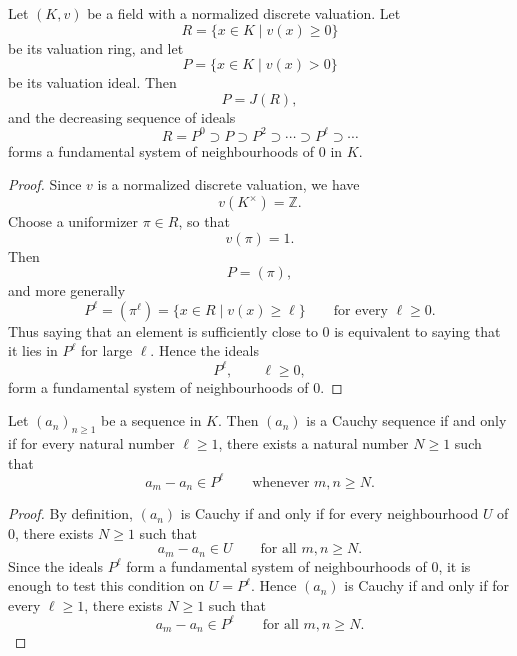 \begin{proposition}
    Let \((K,v)\) be a field with a normalized discrete valuation. Let
    \[
        R=\{x\in K\mid v(x)\geq 0\}
    \]
    be its valuation ring, and let
    \[
        P=\{x\in K\mid v(x)>0\}
    \]
    be its valuation ideal. Then
    \[
        P=J(R),
    \]
    and the decreasing sequence of ideals
    \[
        R=P^0\supset P\supset P^2\supset \cdots \supset P^\ell\supset \cdots
    \]
    forms a fundamental system of neighbourhoods of \(0\) in \(K\).
\end{proposition}

\begin{proof}
    Since \(v\) is a normalized discrete valuation, we have
    \[
        v(K^\times)=\mathbb{Z}.
    \]
    Choose a uniformizer \(\pi\in R\), so that
    \[
        v(\pi)=1.
    \]
    Then
    \[
        P=(\pi),
    \]
    and more generally
    \[
        P^\ell=(\pi^\ell)
        =
        \{x\in R\mid v(x)\geq \ell\}
        \qquad
        \text{for every } \ell\geq 0.
    \]
    Thus saying that an element is sufficiently close to \(0\) is equivalent to
    saying that it lies in \(P^\ell\) for large \(\ell\). Hence the ideals
    \[
        P^\ell,\qquad \ell\geq 0,
    \]
    form a fundamental system of neighbourhoods of \(0\).
\end{proof}

\begin{corollary}
    Let \((a_n)_{n\geq 1}\) be a sequence in \(K\). Then \((a_n)\) is a Cauchy
    sequence if and only if for every natural number \(\ell\geq 1\), there exists
    a natural number \(N\geq 1\) such that
    \[
        a_m-a_n\in P^\ell
        \qquad
        \text{whenever } m,n\geq N.
    \]
\end{corollary}

\begin{proof}
    By definition, \((a_n)\) is Cauchy if and only if for every neighbourhood
    \(U\) of \(0\), there exists \(N\geq 1\) such that
    \[
        a_m-a_n\in U
        \qquad
        \text{for all } m,n\geq N.
    \]
    Since the ideals \(P^\ell\) form a fundamental system of neighbourhoods of
    \(0\), it is enough to test this condition on \(U=P^\ell\). Hence
    \((a_n)\) is Cauchy if and only if for every \(\ell\geq 1\), there exists
    \(N\geq 1\) such that
    \[
        a_m-a_n\in P^\ell
        \qquad
        \text{for all } m,n\geq N.
    \]
\end{proof}

